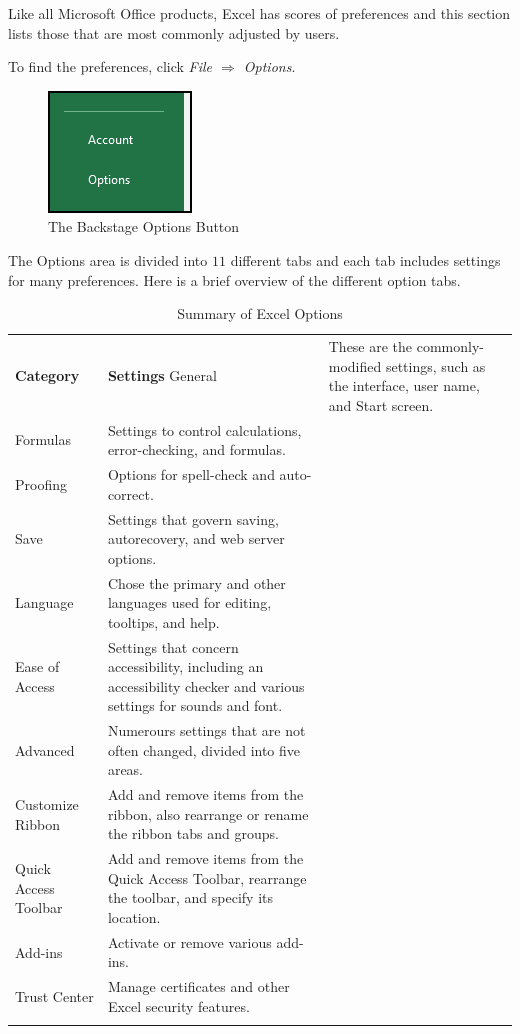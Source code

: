 Like all Microsoft Office products, Excel has scores of preferences and this section lists those that are most commonly adjusted by users.

To find the preferences, click \textit{File $ \Rightarrow $ Options}.

\begin{figure}[H]
	\centering
	\includegraphics[width=\maxwidth{.95\linewidth}]{gfx/ch09_fig50}
	\caption{The Backstage Options Button}
	\label{09:fig68}
\end{figure}
 
The Options area is divided into $ 11 $ different tabs and each tab includes settings for many preferences. Here is a brief overview of the different option tabs.

\begin{table}[H]
	{\small
		\begin{longtable}{L{1.00in}L{3.00in}} %
			\textbf{Category} & \textbf{Settings} \endhead
			\hline
			General & These are the commonly-modified settings, such as the interface, user name, and Start screen.\\
			Formulas & Settings to control calculations, error-checking, and formulas.\\
			Proofing & Options for spell-check and auto-correct.\\
			Save & Settings that govern saving, autorecovery, and web server options.\\
			Language & Chose the primary and other languages used for editing, tooltips, and help.\\
			Ease of Access & Settings that concern accessibility, including an accessibility checker and various settings for sounds and font.\\
			Advanced & Numerours settings that are not often changed, divided into five areas.\\
			Customize Ribbon & Add and remove items from the ribbon, also rearrange or rename the ribbon tabs and groups.\\
			Quick Access Toolbar & Add and remove items from the Quick Access Toolbar, rearrange the toolbar, and specify its location.\\
			Add-ins & Activate or remove various add-ins.\\
			Trust Center & Manage certificates and other Excel security features.\\
			\caption{Summary of Excel Options}
			\label{09:tab03}
		\end{longtable}
	} %
\end{table}

